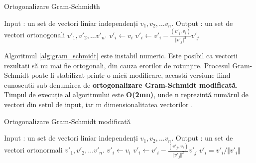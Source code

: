 \begin{algorithm}
\caption{Ortogonalizare Gram-Schmidth}
\label{alg:gram_schmidt}
\begin{algorithmic}
\STATE Input : un set de vectori liniar independenți $v_1, v_2, \dots v_n$.
\STATE Output : un set de vectori ortonogonali $v'_1, v'_2, \dots v'_n$.
\STATE $v'_i \leftarrow v_i$
\STATE $v'_i \leftarrow v'_i - \frac{(v'_j, v_i)}{\Vert v'_j \Vert ^ 2}v'_j$
\ENDFOR 
\ENDFOR
\end{algorithmic}
\end{algorithm}
Algoritmul \ref{alg:gram_schmidt} este instabil numeric. Este posibil ca
vectorii rezultați să nu mai fie ortogonali, din cauza erorilor de rotunjire. 
Procesul Gram-Schmidt poate fi stabilizat printr-o mică modificare, această
versiune fiind cunoscută sub denumirea de \textbf{ortogonalizare Gram-Schmidt
modificată}. Timpul de execuție al algoritmului este \textbf{O(2mn)}, unde n
reprezintă numărul de vectori din setul de input, iar m dimensionalitatea vectorilor
\cite{GolubVanLoan96}.

\begin{algorithm}
\caption{Ortogonalizare Gram-Schmidt modificată}
\label{alg:modified_gram_schmidt}
\begin{algorithmic}
\STATE Input : un set de vectori liniar independenți $v_1, v_2, \dots v_n$.
\STATE Output : un set de vectori ortonormali $v'_1, v'_2, \dots v'_n$.
\STATE $v'_i \leftarrow v_i$
\STATE $v'_i \leftarrow v'_i - \frac{(v'_j, v_i)}{\Vert v'_j \Vert ^ 2}v'_j$
\ENDFOR 
\STATE $v'_i = v'_i / \Vert v'_i \Vert$ 
\ENDFOR
\end{algorithmic}
\end{algorithm}
